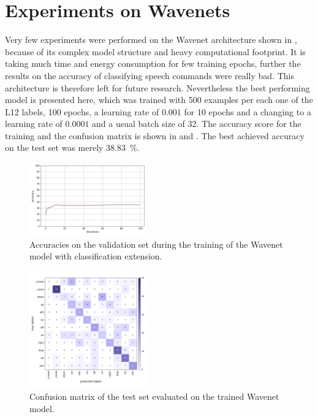 
\section{Experiments on Wavenets}\label{exp_wavenet}
\thesisStateReady
Very few experiments were performed on the Wavenet architecture shown in , because of its complex model structure and heavy computational footprint.
It is taking much time and energy consumption for few training epochs, further the results on the accuracy of classifying speech commands were really bad.
This architecture is therefore left for future research.
Nevertheless the best performing model is presented here, which was trained with 500 examples per each one of the L12 labels, 100 epochs, a learning rate of $0.001$ for 10 epochs and a changing to a learning rate of $0.0001$ and a usual batch size of 32.
The accuracy score for the training and the confusion matrix is shown in  and .
The best achieved accuracy on the test set was merely \SI{38.83}{\percent}.
\begin{figure}[!ht]
  \centering
  \includegraphics[width=0.45\textwidth]{./5_exp/figs/exp_wavenet_acc}
  \caption{Accuracies on the validation set during the training of the Wavenet model with classification extension.}
  \label{fig:exp_wavenet_acc}
\end{figure}
\begin{figure}[!ht]
  \centering
  \includegraphics[width=0.45\textwidth]{./5_exp/figs/exp_wavenet_confusion_test}
  \caption{Confusion matrix of the test set evaluated on the trained Wavenet model.}
  \label{fig:exp_wavenet_confusion}
\end{figure}
\FloatBarrier
\noindent